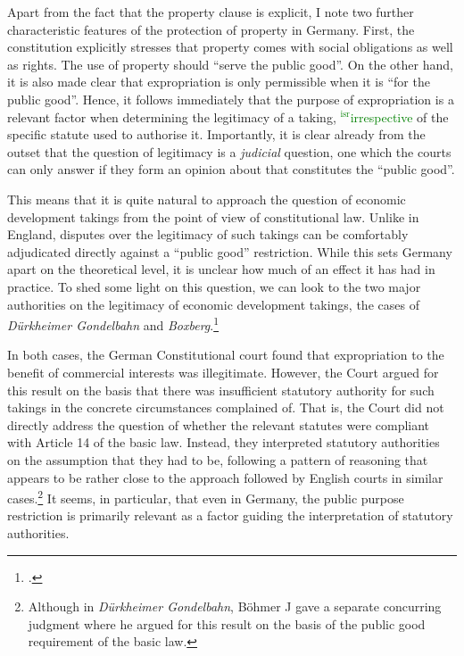 \documentclass[12pt,a4paper]{book} %
\newcommand{\isr}[1]{\textcolor{green}{$^{\textrm{isr}}${#1}}}
\begin{document}
Apart from the fact that the property clause is explicit, I note two further characteristic features of the protection of property in Germany. First, the constitution explicitly stresses that property comes with social obligations as well as rights. The use of property should ``serve the public good''. On the other hand, it is also made clear that expropriation is only permissible when it is ``for the public good''. Hence, it follows immediately that the purpose of expropriation is a relevant factor when determining the legitimacy of a taking, \isr{irrespective} of the specific statute used to authorise it. Importantly, it is clear already from the outset that the question of legitimacy is a \emph{judicial} question, one which the courts can only answer if they form an opinion about that constitutes the ``public good''. 

This means that it is quite natural to approach the question of economic development takings from the point of view of constitutional law. Unlike in England, disputes over the legitimacy of such takings can be comfortably adjudicated directly against a ``public good'' restriction. While this sets Germany apart on the theoretical level, it is unclear how much of an effect it has had in practice. To shed some light on this question, we can look to the two major authorities on the legitimacy of economic development takings, the cases of {\it D\"{u}rkheimer Gondelbahn} and {\it Boxberg}.\footcite{durkheimer81,boxberg86} 

In both cases, the German Constitutional court found that expropriation to the benefit of commercial interests was illegitimate. However, the Court argued for this result on the basis that there was insufficient statutory authority for such takings in the concrete circumstances complained of. That is, the Court did not directly address the question of whether the relevant statutes were compliant with Article 14 of the basic law. Instead, they interpreted statutory authorities on the assumption that they had to be, following a pattern of reasoning that appears to be rather close to the approach followed by English courts in similar cases.\footnote{Although in {\it Dürkheimer Gondelbahn}, Böhmer J gave a separate concurring judgment where he argued for this result on the basis of the public good requirement of the basic law.} It seems, in particular, that even in Germany, the public purpose restriction is primarily relevant as a factor guiding the interpretation of statutory authorities.
\end{document}
